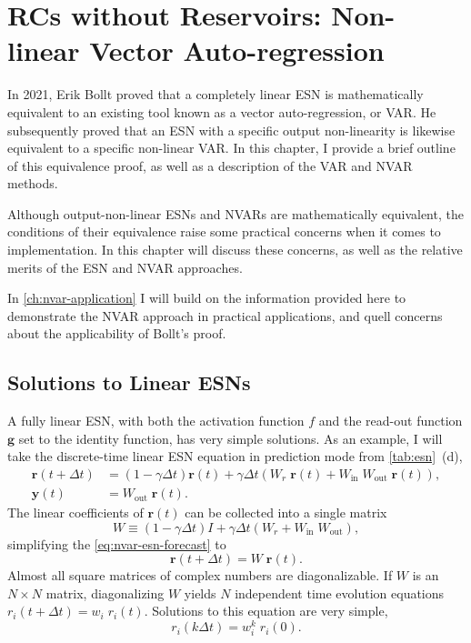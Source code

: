 \chapter{RCs without Reservoirs: Non-linear Vector Auto-regression}\label{ch:nvar}

In 2021, Erik Bollt proved\cite{bollt2021} that a completely linear
ESN is mathematically equivalent to an existing tool known as a vector
auto-regression, or VAR. He subsequently proved that an ESN with a
specific output non-linearity is likewise equivalent to a specific
non-linear VAR. In this chapter, I provide a brief outline of this
equivalence proof, as well as a description of the VAR and NVAR
methods.

Although output-non-linear ESNs and NVARs are mathematically
equivalent, the conditions of their equivalence raise some practical
concerns when it comes to implementation. In this chapter will discuss
these concerns, as well as the relative merits of the ESN and NVAR
approaches.

In \cref{ch:nvar-application} I will build on the information provided
here to demonstrate the NVAR approach in practical applications, and
quell concerns about the applicability of Bollt's proof.

\section{Solutions to Linear ESNs}

A fully linear ESN, with both the activation function $f$ and the
read-out function $\bm{g}$ set to the identity function, has very
simple solutions. As an example, I will take the discrete-time linear
ESN equation in prediction mode from \cref{tab:esn}~(d),
\begin{align}
  \bm{r}(t + \Delta t) &= (1 - \gamma \Delta t) \bm{r}(t) + \gamma \Delta t \left( W_r\;\bm{r}(t) + W_\text{in}\;W_\text{out}\;\bm{r}(t)\right), \label{eq:nvar-esn-forecast} \\
  \bm{y}(t) &= W_\text{out}\;\bm{r}(t).
\end{align}
The linear coefficients of $\bm{r}(t)$ can be collected into a single matrix
\begin{equation}
  W \equiv (1 - \gamma \Delta t) I + \gamma \Delta t \left( W_r + W_\text{in}\;W_\text{out}\right),
\end{equation}
simplifying the \cref{eq:nvar-esn-forecast} to
\begin{equation}
  \bm{r}(t + \Delta t) = W\;\bm{r}(t).
\end{equation}
Almost all square matrices of complex numbers are diagonalizable. If
$W$ is an $N \times N$ matrix, diagonalizing $W$ yields $N$
independent time evolution equations $r_i(t + \Delta t) = w_i\;
r_i(t)$. Solutions to this equation are very simple,
\begin{equation}
  r_i(k \Delta t) = w_i^k\; r_i(0).
\end{equation}


